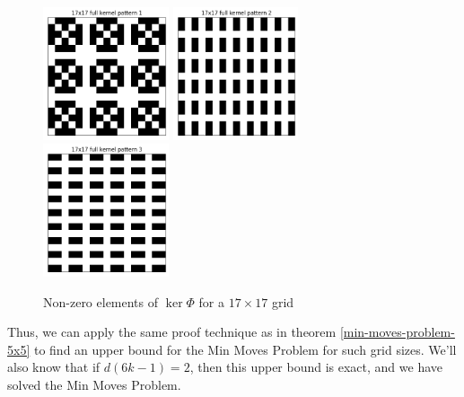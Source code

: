 \documentclass[a4paper]{article}
\begin{document}
	\begin{figure}[H]
		\centering
		\includegraphics[width=0.33\textwidth]{../../code/serialization/kernels/17x17/full/17x17_kernel_full_1.png}
		\includegraphics[width=0.33\textwidth]{../../code/serialization/kernels/17x17/full/17x17_kernel_full_2.png}
		\includegraphics[width=0.33\textwidth]{../../code/serialization/kernels/17x17/full/17x17_kernel_full_3.png}
		\caption{Non-zero elements of $\ker{\Phi}$ for a $17 \times 17$ grid}
	\end{figure}
	
	Thus, we can apply the same proof technique as in theorem \ref{min-moves-problem-5x5} to find an upper bound for the Min Moves Problem for such grid sizes.
	We'll also know that if $d(6k - 1) = 2$, then this upper bound is exact, and we have solved the Min Moves Problem.
	
\end{document}
